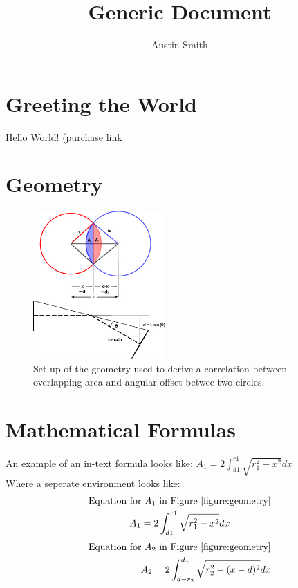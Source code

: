 \documentclass{article}
\title{Generic Document}
\author{Austin Smith}
\date{}
\begin{document}
\maketitle{}
\section{Greeting the World}
Hello World! \cite{ECP}
\href{https://www.amazon.com/Effective-Computation-Physics-Research-Python/dp/1491901535}{(purchase link}
\section{Geometry}
\begin{figure}[thp]
    \centering
    \includegraphics[width=0.45\textwidth]{geometry.jpg}
    \caption{Set up of the geometry used to derive a correlation between
    overlapping area and angular offset betwee two circles.}
    \label{figure:geometry}
\end{figure}
\section{Mathematical Formulas}
An example of an in-text formula looks like: $A_{1} = 2\int_{d1}^{r1}\sqrt{r_{1}^{2}-x^{2}}dx$\\
Where a seperate environment looks like:
\begin{equation}
 \begin{gathered}
  \textrm{Equation for $A_{1}$ in Figure \ref{figure:geometry}} \\
  A_{1} = 2\int_{d1}^{r1}\sqrt{r_{1}^{2}-x^{2}}dx \nonumber
 \end{gathered}
\end{equation}
\begin{align}
\textrm{Equation for $A_{2}$ in Figure \ref{figure:geometry}} \\
A_{2} = 2\int_{d-r_{2}}^{d1}\sqrt{r_{2}^{2}-(x-d)^{2}}dx \nonumber
\end{align}
\printbibliography
\end{document}
